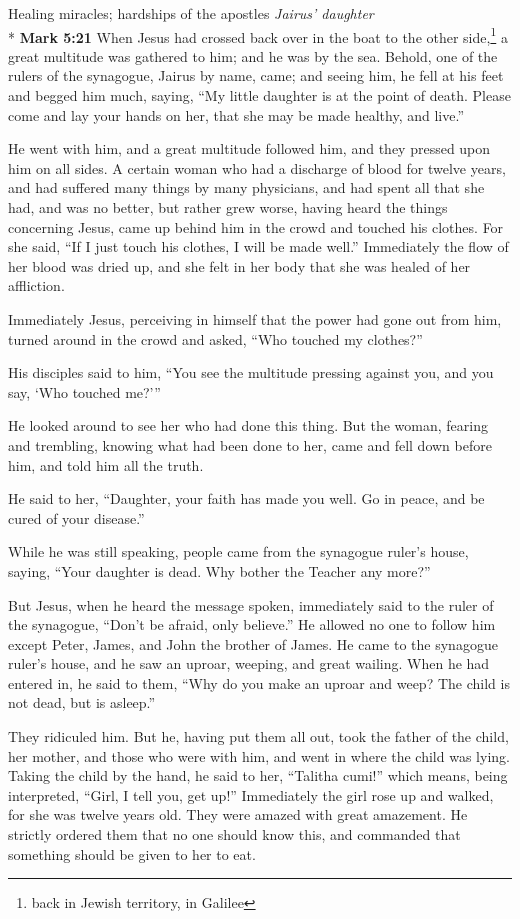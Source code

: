\documentclass[10pt,twoside]{article} %
\newcommand{\quotesize}{\normalsize{}}
\newenvironment{quotetext}{\begingroup\quotesize}{\endgroup}
\newcommand{\intex}[1]{\index[texts]{#1}}
\newcommand{\bible}[2]{\begin{quotetext}\textbf{#1}\intex{#1} #2\end{quotetext}}
\newcommand{\gospelmark}[2]{\bible{Mark #1}{#2}}
\newcommand{\subhead}[1]{\emph{#1}\\*}
\begin{document}
\begin{section}{Healing miracles; hardships of the apostles}
\subhead{Jairus' daughter}
\gospelmark{5:21}{
  When Jesus had crossed back over in the boat to the other side,\footnote{back in Jewish territory, in Galilee} a great multitude was gathered to him; and he was by the sea.   Behold, one of the rulers of the synagogue, Jairus by name, came; and seeing him, he fell at his feet   and begged him much, saying, ``My little daughter is at the point of death. Please come and lay your hands on her, that she may be made healthy, and live.''

  He went with him, and a great multitude followed him, and they pressed upon him on all sides.   A certain woman who had a discharge of blood for twelve years,   and had suffered many things by many physicians, and had spent all that she had, and was no better, but rather grew worse,   having heard the things concerning Jesus, came up behind him in the crowd and touched his clothes.   For she said, ``If I just touch his clothes, I will be made well.''   Immediately the flow of her blood was dried up, and she felt in her body that she was healed of her affliction.

  Immediately Jesus, perceiving in himself that the power had gone out from him, turned around in the crowd and asked, ``Who touched my clothes?''

  His disciples said to him, ``You see the multitude pressing against you, and you say, `Who touched me?'{}''

  He looked around to see her who had done this thing.   But the woman, fearing and trembling, knowing what had been done to her, came and fell down before him, and told him all the truth.

  He said to her, ``Daughter, your faith has made you well. Go in peace, and be cured of your disease.''

  While he was still speaking, people came from the synagogue ruler's house, saying, ``Your daughter is dead. Why bother the Teacher any more?''

  But Jesus, when he heard the message spoken, immediately said to the ruler of the synagogue, ``Don't be afraid, only believe.''   He allowed no one to follow him except Peter, James, and John the brother of James.   He came to the synagogue ruler's house, and he saw an uproar, weeping, and great wailing.   When he had entered in, he said to them, ``Why do you make an uproar and weep? The child is not dead, but is asleep.''

  They ridiculed him. But he, having put them all out, took the father of the child, her mother, and those who were with him, and went in where the child was lying.   Taking the child by the hand, he said to her, ``Talitha cumi!'' which means, being interpreted, ``Girl, I tell you, get up!''   Immediately the girl rose up and walked, for she was twelve years old. They were amazed with great amazement.   He strictly ordered them that no one should know this, and commanded that something should be given to her to eat.}


\end{section}
\end{document}
